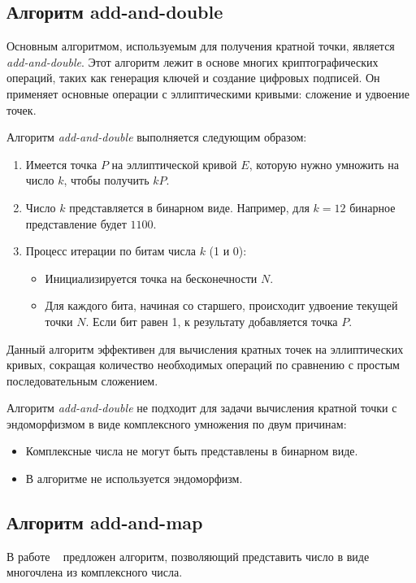 \subsection*{Алгоритм add-and-double}
Основным алгоритмом, используемым для получения кратной точки, является \textit{add-and-double}. Этот алгоритм лежит в основе многих криптографических операций, таких как генерация ключей и создание цифровых подписей. Он применяет основные операции с эллиптическими кривыми: сложение и удвоение точек.

Алгоритм \textit{add-and-double} выполняется следующим образом:

\begin{enumerate}
    \item Имеется точка $P$ на эллиптической кривой $E$, которую нужно умножить на число $k$, чтобы получить $kP$.
    \item Число $k$ представляется в бинарном виде. Например, для $k = 12$ бинарное представление будет $1100$.
    \item Процесс итерации по битам числа $k$ (1 и 0):
    \begin{itemize}
        \item Инициализируется точка на бесконечности $N$.
        \item Для каждого бита, начиная со старшего, происходит удвоение текущей точки $N$. Если бит равен 1, к результату добавляется точка $P$.
    \end{itemize}
\end{enumerate}

Данный алгоритм эффективен для вычисления кратных точек на эллиптических кривых, сокращая количество необходимых операций по сравнению с простым последовательным сложением.

Алгоритм \textit{add-and-double} не подходит для задачи вычисления кратной точки с эндоморфизмом в виде комплексного умножения по двум причинам:

\begin{itemize}
    \item Комплексные числа не могут быть представлены в бинарном виде.
    \item В алгоритме не используется эндоморфизм.
\end{itemize}


\subsection*{Алгоритм add-and-map}

В работе ~\cite{nesterenko-disser} предложен алгоритм, позволяющий представить число в виде многочлена из комплексного числа.

